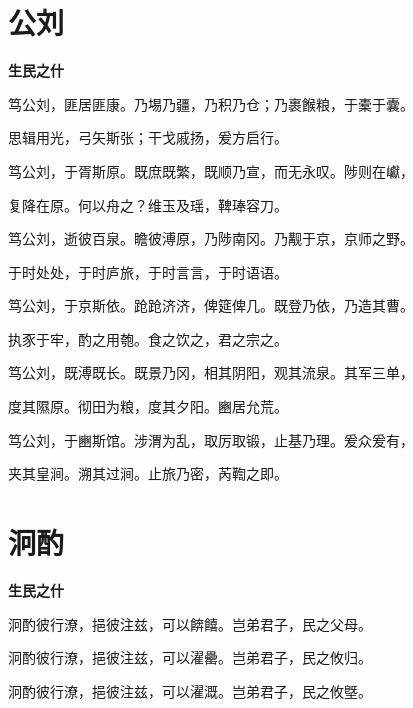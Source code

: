 \documentclass[12pt,a4paper]{ctexbook}
\begin{document}
\section{公刘}
\textbf{生民之什}\par\vspace{0.5em}
笃公刘，匪居匪康。乃埸乃疆，乃积乃仓；乃裹餱粮，于橐于囊。\par
思辑用光，弓矢斯张；干戈戚扬，爰方启行。\par
笃公刘，于胥斯原。既庶既繁，既顺乃宣，而无永叹。陟则在巘，\par
复降在原。何以舟之？维玉及瑶，鞞琫容刀。\par
笃公刘，逝彼百泉。瞻彼溥原，乃陟南冈。乃觏于京，京师之野。\par
于时处处，于时庐旅，于时言言，于时语语。\par
笃公刘，于京斯依。跄跄济济，俾筵俾几。既登乃依，乃造其曹。\par
执豕于牢，酌之用匏。食之饮之，君之宗之。\par
笃公刘，既溥既长。既景乃冈，相其阴阳，观其流泉。其军三单，\par
度其隰原。彻田为粮，度其夕阳。豳居允荒。\par
笃公刘，于豳斯馆。涉渭为乱，取厉取锻，止基乃理。爰众爰有，\par
夹其皇涧。溯其过涧。止旅乃密，芮鞫之即。\par

\section{泂酌}
\textbf{生民之什}\par\vspace{0.5em}
泂酌彼行潦，挹彼注兹，可以餴饎。岂弟君子，民之父母。\par
泂酌彼行潦，挹彼注兹，可以濯罍。岂弟君子，民之攸归。\par
泂酌彼行潦，挹彼注兹，可以濯溉。岂弟君子，民之攸墍。\par
\end{document}
